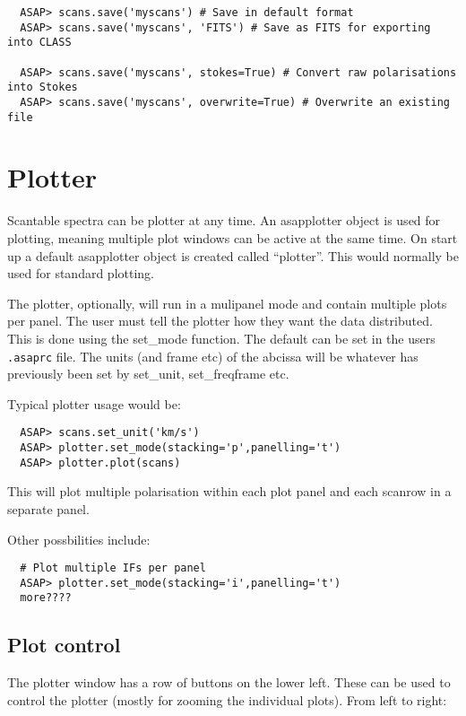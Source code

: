 \documentclass[11pt]{article}
\begin{document}
\begin{verbatim}
  ASAP> scans.save('myscans') # Save in default format
  ASAP> scans.save('myscans', 'FITS') # Save as FITS for exporting into CLASS

  ASAP> scans.save('myscans', stokes=True) # Convert raw polarisations into Stokes
  ASAP> scans.save('myscans', overwrite=True) # Overwrite an existing file
\end{verbatim}



\section{Plotter}

Scantable spectra can be plotter at any time. An asapplotter object is
used for plotting, meaning multiple plot windows can be active at the
same time. On start up a default asapplotter object is created called
``plotter''. This would normally be used for standard plotting.

The plotter, optionally, will run in a mulipanel mode and contain
multiple plots per panel. The user must tell the plotter how they want
the data distributed. This is done using the set\_mode function. The
default can be set in the users {\tt .asaprc} file. The units (and frame
etc) of the abcissa will be whatever has previously been set by
set\_unit, set\_freqframe etc.

Typical plotter usage would be:

\begin{verbatim}
  ASAP> scans.set_unit('km/s')
  ASAP> plotter.set_mode(stacking='p',panelling='t')
  ASAP> plotter.plot(scans)
\end{verbatim}

This will plot multiple polarisation within each plot panel and each
scanrow in a separate panel.

Other possbilities include:

\begin{verbatim}
  # Plot multiple IFs per panel
  ASAP> plotter.set_mode(stacking='i',panelling='t')
  more????
\end{verbatim}

\subsection{Plot control}

The plotter window has a row of buttons on the lower left. These can
be used to control the plotter (mostly for zooming the individual
plots). From left to right:
\end{document}
